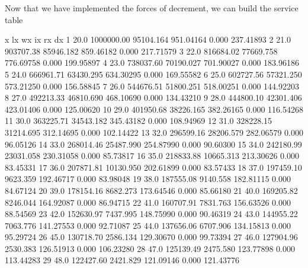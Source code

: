 \documentclass{article}
\begin{document}
Now that we have implemented the forces of decrement, we can build the service table
\begin{Schunk}
\begin{Soutput}
      x         lx        wx        ix        rx        dx
1  20.0 1000000.00 95104.164 951.04164     0.000 237.41893
2  21.0  903707.38 85946.182 859.46182     0.000 217.71579
3  22.0  816684.02 77669.758 776.69758     0.000 199.95897
4  23.0  738037.60 70190.027 701.90027     0.000 183.96186
5  24.0  666961.71 63430.295 634.30295     0.000 169.55582
6  25.0  602727.56 57321.250 573.21250     0.000 156.58845
7  26.0  544676.51 51800.251 518.00251     0.000 144.92203
8  27.0  492213.33 46810.690 468.10690     0.000 134.43210
9  28.0  444800.10 42301.406 423.01406     0.000 125.00620
10 29.0  401950.68 38226.165 382.26165     0.000 116.54268
11 30.0  363225.71 34543.182 345.43182     0.000 108.94969
12 31.0  328228.15 31214.695 312.14695     0.000 102.14422
13 32.0  296599.16 28206.579 282.06579     0.000  96.05126
14 33.0  268014.46 25487.990 254.87990     0.000  90.60300
15 34.0  242180.99 23031.058 230.31058     0.000  85.73817
16 35.0  218833.88 10665.313 213.30626     0.000  83.45331
17 36.0  207871.81 10130.950 202.61899     0.000  83.57433
18 37.0  197459.10  9623.359 192.46717     0.000  83.98048
19 38.0  187555.08  9140.558 182.81115     0.000  84.67124
20 39.0  178154.16  8682.273 173.64546     0.000  85.66180
21 40.0  169205.82  8246.044 164.92087     0.000  86.94715
22 41.0  160707.91  7831.763 156.63526     0.000  88.54569
23 42.0  152630.97  7437.995 148.75990     0.000  90.46319
24 43.0  144955.22  7063.776 141.27553     0.000  92.71087
25 44.0  137656.06  6707.906 134.15813     0.000  95.29724
26 45.0  130718.70  2586.134 129.30670     0.000  99.73394
27 46.0  127904.96  2530.383 126.51913     0.000 106.23280
28 47.0  125139.49  2475.580 123.77898     0.000 113.44283
29 48.0  122427.60  2421.829 121.09146     0.000 121.43776

\end{Soutput}
\end{Schunk}
\end{document}
